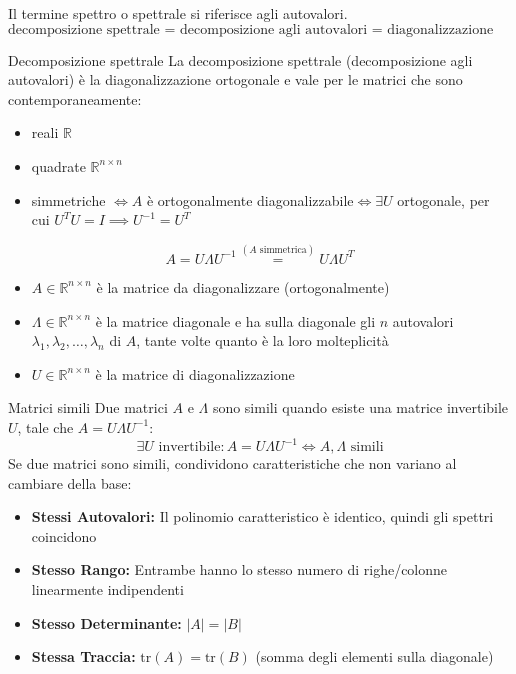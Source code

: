 	Il termine spettro o spettrale si riferisce agli autovalori.
	$$
	\text{decomposizione spettrale = decomposizione agli autovalori = diagonalizzazione ortogonale}
	$$
	\begin{mybox2}{Decomposizione spettrale}
		La decomposizione spettrale (decomposizione agli autovalori) è la diagonalizzazione ortogonale e vale per le matrici che sono contemporaneamente:
		\begin{itemize}[itemsep=3pt, topsep=3pt]
		  \item reali $\mathbb{R}$
		  \item quadrate $\mathbb{R}^{n\times n}$
		  \item simmetriche $\iff$$A$ è ortogonalmente diagonalizzabile$\iff\exists U$ ortogonale, per cui $U^TU=I\implies U^{-1}=U^T$
		\end{itemize}
		$$
		A=U\Lambda U^{-1}\overset{(A\text{ simmetrica})}{=}U\Lambda U^T
		$$
		\begin{itemize}[itemsep=3pt, topsep=3pt]
		  \item $A\in\mathbb{R}^{n\times n}$ è la matrice da diagonalizzare (ortogonalmente)
		  \item $\Lambda\in\mathbb{R}^{n\times n}$ è la matrice diagonale e ha sulla diagonale gli $n$ autovalori $\lambda_1, \lambda_2, \dots, \lambda_n$ di $A$, tante volte quanto è la loro molteplicità
		  \item $U\in\mathbb{R}^{n\times n}$ è la matrice di diagonalizzazione
		\end{itemize}
	\end{mybox2}
	
	\begin{mybox2}{Matrici simili}
		Due matrici $A$ e $\Lambda$ sono simili quando esiste una matrice invertibile $U$, tale che $A=U\Lambda U^{-1}$:
		$$
		\exists U\text{ invertibile} :A=U\Lambda U^{-1}\iff A,\Lambda\text{ simili}
		$$
		Se due matrici sono simili, condividono caratteristiche che non variano al cambiare della base:
		\begin{itemize}[itemsep=3pt, topsep=3pt]
		  \item \textbf{Stessi Autovalori:} Il polinomio caratteristico è identico, quindi gli spettri coincidono
		  \item \textbf{Stesso Rango:} Entrambe hanno lo stesso numero di righe/colonne linearmente indipendenti
		  \item \textbf{Stesso Determinante:} $|A| = |B|$
		  \item \textbf{Stessa Traccia:} $\text{tr}(A) = \text{tr}(B)$ (somma degli elementi sulla diagonale)
		\end{itemize}
	\end{mybox2}
	
